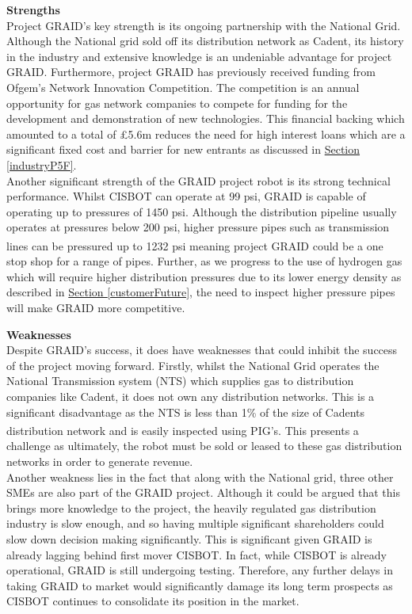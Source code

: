 \documentclass[11pt]{article}		%
\newcommand{\supercite}[1]{\textsuperscript{\cite{#1}}}		%
\newcommand{\sectref}[1]{\hyperref[#1]{Section \ref*{#1}}}     %
\begin{document}
			\textbf{Strengths} \\
			Project GRAID's key strength is its ongoing partnership with the National Grid. Although the National grid sold off its distribution network as Cadent, its history in the industry and extensive knowledge is an undeniable advantage for project GRAID. Furthermore, project GRAID has previously received funding from Ofgem's Network Innovation Competition. The competition is an annual opportunity for gas network companies to compete for funding for the development and demonstration of new technologies. This financial backing which amounted to a total of £5.6m reduces the need for high interest loans which are a significant fixed cost and barrier for new entrants as discussed in \sectref{industryP5F}. \\
		    \hspace*{3ex}Another significant strength of the GRAID project robot is its strong technical performance. Whilst CISBOT can operate at 99 psi, GRAID is capable of operating up to pressures of 1450 psi. Although the distribution pipeline usually operates at pressures below 200 psi, higher pressure pipes such as transmission lines can be pressured up to 1232 psi \supercite{transmissionpressure} meaning project GRAID could be a one stop shop for a range of pipes. Further, as we progress to the use of hydrogen gas which will require higher distribution pressures due to its lower energy density as described in \sectref{customerFuture}, the need to inspect higher pressure pipes will make GRAID more competitive. 
	        
	        \textbf{Weaknesses}\\
	        Despite GRAID’s success, it does have weaknesses that could inhibit the success of the project moving forward. Firstly, whilst the National Grid operates the National Transmission system (NTS) which supplies gas to distribution companies like Cadent, it does not own any distribution networks. This is a significant disadvantage as the NTS is less than 1\% of the size of Cadents distribution network\supercite{NTSlength} and is easily inspected using PIG’s. This presents a challenge as ultimately, the robot must be sold or leased to these gas distribution networks in order to generate revenue. \\
	        \hspace*{3ex}Another weakness lies in the fact that along with the National grid, three other SMEs are also part of the GRAID project. Although it could be argued that this brings more knowledge to the project, the heavily regulated gas distribution industry is slow enough, and so having multiple significant shareholders could slow down decision making significantly. This is significant given GRAID is already lagging behind first mover CISBOT. In fact, while CISBOT is already operational, GRAID is still undergoing testing. Therefore, any further delays in taking GRAID to market would significantly damage its long term prospects as CISBOT continues to consolidate its position in the market.
	        
\end{document}
